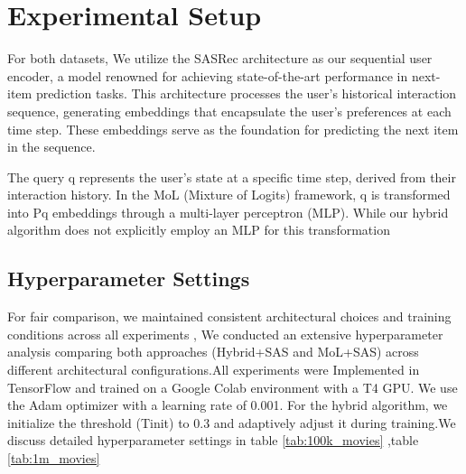 \section{Experimental Setup}
For both datasets, We utilize the SASRec architecture as our sequential user encoder, a model renowned for achieving state-of-the-art performance in next-item prediction tasks. This architecture processes the user's historical interaction sequence, generating embeddings that encapsulate the user's preferences at each time step. These embeddings serve as the foundation for predicting the next item in the sequence.

The query q represents the user's state at a specific time step, derived from their interaction history. In the MoL (Mixture of Logits) framework, q is transformed into Pq
embeddings through a multi-layer perceptron (MLP). While our hybrid algorithm does not explicitly employ an MLP for this transformation
\subsection{Hyperparameter Settings}
For fair comparison, we maintained consistent architectural choices and training conditions across all experiments , We conducted an extensive hyperparameter analysis comparing both approaches (Hybrid+SAS and MoL+SAS) across different architectural configurations.All experiments were Implemented in TensorFlow and trained on a Google Colab environment with a T4 GPU. We use the Adam optimizer with a learning rate of 0.001. For the hybrid algorithm, we initialize the threshold (Tinit) to 0.3 and adaptively adjust it during training.We discuss detailed hyperparameter settings in table \ref{tab:100k_movies} ,table \ref{tab:1m_movies}

\setlength{\tabcolsep}{1pt} %

